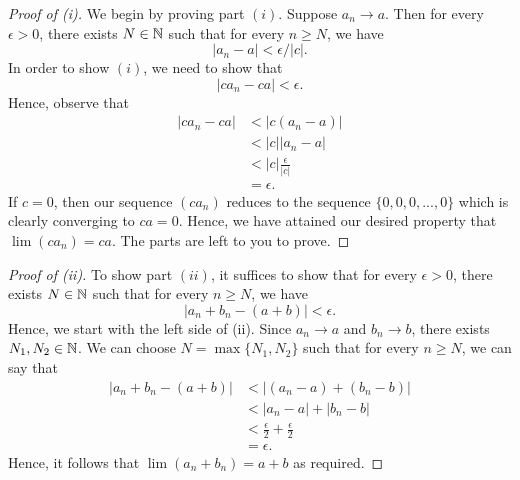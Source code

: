 \begin{proof}[Proof of (i)]
We begin by proving part \( (i)\). Suppose \( a_n \to a \). Then for every \( \epsilon  > 0 \), there exists 
\( N \in \mathbb{N} \) such that for every \( n \geq N \), we have 
\[ | a_n  - a  | < \epsilon / | c |. \tag{1}\]
In order to show \( (i)\), we need to show that 
\[ | ca_n - ca | < \epsilon.\]
Hence, observe that 
\begin{align*}
| ca_n - ca |&< | c(a_n - a) | \\
&< | c | | a_n - a  | \\  
&< | c | \frac{ \epsilon  }{ | c |} \\ 
&= \epsilon.   
\end{align*}
If \( c = 0 \), then our sequence \( (ca_n)\) reduces to the sequence \( \{0,0,0,...,0 \}\) which is clearly converging to \( ca = 0 \).
Hence, we have attained our desired property that \( \lim (ca_n) = ca\).
The parts are left to you to prove.
\end{proof}
\begin{proof}[Proof of (ii)]
    To show part \( (ii)\), it suffices to show that for every \( \epsilon> 0 \), there exists \( N \in \mathbb{N} \) such that for every \( n \geq N \), we have 
    \[ | a_n + b_n - (a+b) | < \epsilon.\] Hence, we start with the left side of (ii). Since \( a_n \to a \) and \( b_n \to b\), there exists \( N_1, N_2 \in \mathbb{N} \). We can choose \( N = \max \{ N_1, N_2 \}\) such that for every \( n \geq N \), we can say that 
    \begin{align*}
     | a_n + b_n - (a + b) | &< | (a_n-a) + (b_n - b) |  \\
                             &< | a_n - a  |  + | b_n - b | \\ 
                             &< \frac{ \epsilon }{2} + \frac{ \epsilon }{ 2} \\  
                             &= \epsilon. 
    \end{align*}
Hence, it follows that \( \lim (a_n + b_n) = a + b \) as required.

\end{proof}

